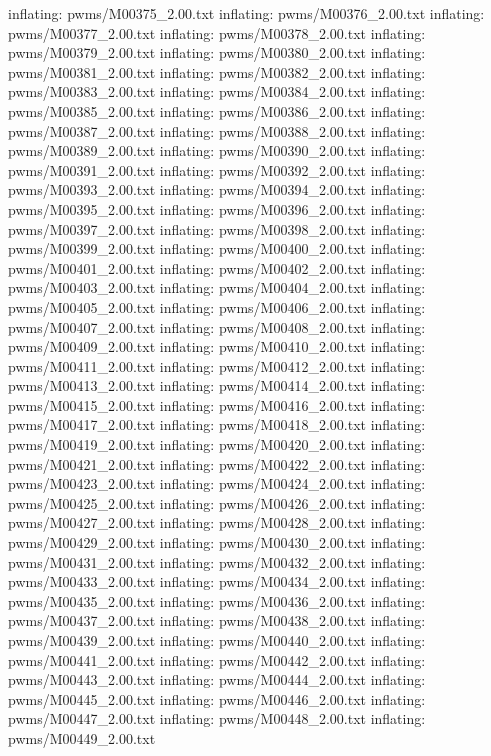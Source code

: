 \documentclass[letterpaper,10pt,english]{sphinxmanual}
\begin{document}
{\begin{sphinxVerbatim}[commandchars=\\\{\}]
  inflating: pwms/M00375\_2.00.txt
  inflating: pwms/M00376\_2.00.txt
  inflating: pwms/M00377\_2.00.txt
  inflating: pwms/M00378\_2.00.txt
  inflating: pwms/M00379\_2.00.txt
  inflating: pwms/M00380\_2.00.txt
  inflating: pwms/M00381\_2.00.txt
  inflating: pwms/M00382\_2.00.txt
  inflating: pwms/M00383\_2.00.txt
  inflating: pwms/M00384\_2.00.txt
  inflating: pwms/M00385\_2.00.txt
  inflating: pwms/M00386\_2.00.txt
  inflating: pwms/M00387\_2.00.txt
  inflating: pwms/M00388\_2.00.txt
  inflating: pwms/M00389\_2.00.txt
  inflating: pwms/M00390\_2.00.txt
  inflating: pwms/M00391\_2.00.txt
  inflating: pwms/M00392\_2.00.txt
  inflating: pwms/M00393\_2.00.txt
  inflating: pwms/M00394\_2.00.txt
  inflating: pwms/M00395\_2.00.txt
  inflating: pwms/M00396\_2.00.txt
  inflating: pwms/M00397\_2.00.txt
  inflating: pwms/M00398\_2.00.txt
  inflating: pwms/M00399\_2.00.txt
  inflating: pwms/M00400\_2.00.txt
  inflating: pwms/M00401\_2.00.txt
  inflating: pwms/M00402\_2.00.txt
  inflating: pwms/M00403\_2.00.txt
  inflating: pwms/M00404\_2.00.txt
  inflating: pwms/M00405\_2.00.txt
  inflating: pwms/M00406\_2.00.txt
  inflating: pwms/M00407\_2.00.txt
  inflating: pwms/M00408\_2.00.txt
  inflating: pwms/M00409\_2.00.txt
  inflating: pwms/M00410\_2.00.txt
  inflating: pwms/M00411\_2.00.txt
  inflating: pwms/M00412\_2.00.txt
  inflating: pwms/M00413\_2.00.txt
  inflating: pwms/M00414\_2.00.txt
  inflating: pwms/M00415\_2.00.txt
  inflating: pwms/M00416\_2.00.txt
  inflating: pwms/M00417\_2.00.txt
  inflating: pwms/M00418\_2.00.txt
  inflating: pwms/M00419\_2.00.txt
  inflating: pwms/M00420\_2.00.txt
  inflating: pwms/M00421\_2.00.txt
  inflating: pwms/M00422\_2.00.txt
  inflating: pwms/M00423\_2.00.txt
  inflating: pwms/M00424\_2.00.txt
  inflating: pwms/M00425\_2.00.txt
  inflating: pwms/M00426\_2.00.txt
  inflating: pwms/M00427\_2.00.txt
  inflating: pwms/M00428\_2.00.txt
  inflating: pwms/M00429\_2.00.txt
  inflating: pwms/M00430\_2.00.txt
  inflating: pwms/M00431\_2.00.txt
  inflating: pwms/M00432\_2.00.txt
  inflating: pwms/M00433\_2.00.txt
  inflating: pwms/M00434\_2.00.txt
  inflating: pwms/M00435\_2.00.txt
  inflating: pwms/M00436\_2.00.txt
  inflating: pwms/M00437\_2.00.txt
  inflating: pwms/M00438\_2.00.txt
  inflating: pwms/M00439\_2.00.txt
  inflating: pwms/M00440\_2.00.txt
  inflating: pwms/M00441\_2.00.txt
  inflating: pwms/M00442\_2.00.txt
  inflating: pwms/M00443\_2.00.txt
  inflating: pwms/M00444\_2.00.txt
  inflating: pwms/M00445\_2.00.txt
  inflating: pwms/M00446\_2.00.txt
  inflating: pwms/M00447\_2.00.txt
  inflating: pwms/M00448\_2.00.txt
  inflating: pwms/M00449\_2.00.txt

\end{sphinxVerbatim}}
\end{document}

